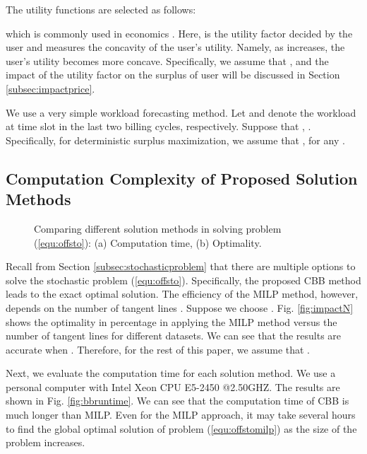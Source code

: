 \documentclass[10pt,journal,compsoc]{IEEEtran}
\begin{document}
The utility functions are selected as follows:

which is commonly used in economics \cite{Joe-Wong2012, Nicholson2011}. Here,  is the utility factor decided by the user and  measures the concavity of the user's utility. Namely, as  increases, the user's utility becomes more concave. Specifically, we assume that ,  and the impact of the utility factor  on the surplus of user will be discussed in Section \ref{subsec:impactprice}.



We use a very simple workload forecasting method. Let  and  denote the workload at time slot  in the last two billing cycles, respectively. Suppose that , . Specifically, for deterministic surplus maximization, we assume that , for any . 





\subsection{Computation Complexity of Proposed Solution Methods}\label{subsec:impacttengentslines}
\begin{figure}[!t]
\centering
{}
\caption{Comparing different solution methods in solving problem (\ref{equ:offsto}): (a) Computation time, (b) Optimality.}\vspace{-0.35cm}\label{fig:near}
\end{figure}

Recall from Section \ref{subsec:stochasticproblem} that there are multiple options to solve the stochastic problem (\ref{equ:offsto}). Specifically, the proposed CBB method leads to the exact optimal solution. The efficiency of the MILP method, however, depends on the number of tangent lines . Suppose we choose . Fig. \ref{fig:impactN} shows the optimality in percentage in applying the MILP method versus the number of tangent lines  for different datasets. We can see that the results are accurate when . Therefore, for the rest of this paper, we assume that .











Next, we evaluate the computation time for each solution method. We use a personal computer with Intel Xeon CPU E5-2450 @2.50GHZ. The results are shown in Fig. \ref{fig:bbruntime}. We can see that the computation time of CBB is much longer than MILP. Even for the MILP approach, it may take several hours to find the global optimal solution of problem (\ref{equ:offstomilp}) as the size of the problem increases.
\end{document}
